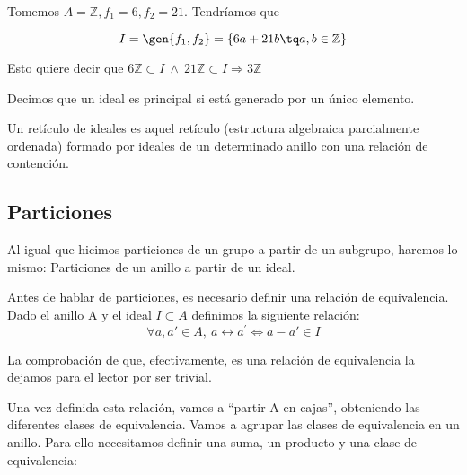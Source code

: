 \documentclass[nochap]{apuntes}
\begin{document}
\begin{example} Tomemos $A = \mathbb{Z}, f_1=6, f_2=21$. Tendríamos que

\[ I=\gen{f_1,f_2}=\{6a+21b \tq a,b\in \mathbb{Z}\} \]

Esto quiere decir que $6\mathbb{Z}\subset I \ \wedge \ 21\mathbb{Z}\subset I \Rightarrow 3\mathbb{Z}$
\end{example}
\begin{defn}\label{defPrincipal}
 Decimos que un ideal es principal si está generado por un único elemento.
\end{defn}

\begin{defn}
Un retículo de ideales es aquel retículo (estructura algebraica parcialmente ordenada) formado por ideales de un determinado anillo
con una relación de contención.
\end{defn}

\subsection{Particiones}
Al igual que hicimos particiones de un grupo a partir de un subgrupo, haremos lo mismo: Particiones de un anillo a partir de un ideal.

Antes de hablar de particiones, es necesario definir una relación de equivalencia. Dado el anillo A y el ideal $I \subset A$ definimos la siguiente relación:
\[\forall a, a' \in A, \ a\rel a^{'} \Leftrightarrow a - a' \in I \]

La comprobación de que, efectivamente, es una relación de equivalencia la dejamos para el lector por ser trivial.

Una vez definida esta relación, vamos a ``partir A en cajas'', obteniendo las diferentes clases de equivalencia. Vamos a agrupar las clases de equivalencia en un anillo. Para ello necesitamos definir una suma, un producto y una clase de equivalencia:
\end{document}
